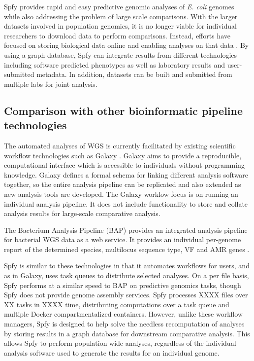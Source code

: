 \documentclass{article}
\begin{document}
Spfy provides rapid and easy predictive genomic analyses of \textit{E. coli} genomes while also addressing the problem of large scale comparisons. With the larger datasets involved in population genomics, it is no longer viable for individual researchers to download data to perform comparisons. Instead, efforts have focused on storing biological data online and enabling analyses on that data \cite{schatz2015biological}. By using a graph database, Spfy can integrate results from  different technologies including software predicted phenotypes as well as laboratory results and user-submitted metadata. In addition, datasets can be built and submitted from multiple labs for joint analysis. 

\subsection{Comparison with other bioinformatic pipeline technologies}


The automated analyses of WGS is currently facilitated by existing scientific workflow technologies such as Galaxy \cite{goecks2010galaxy}. Galaxy aims to provide a reproducible, computational interface which is accessible to individuals without programming knowledge. Galaxy defines a formal schema for linking different analysis software together, so the entire analysis pipeline can be replicated and also extended as new analysis tools are developed. The Galaxy worklow focus is on running an individual analysis pipeline. It does not include functionality to store and collate analysis results for large-scale comparative analysis.

The Bacterium Analysis Pipeline (BAP) \cite{thomsen2016bacterial} provides an integrated analysis pipeline for bacterial WGS data as a web service. It provides an individual per-genome report of the determined species, multilocus sequence type, VF and AMR genes \cite{thomsen2016bacterial}.

Spfy is similar to these technologies in that it automates workflows for users, and as in Galaxy, uses task queues to distribute selected analyses.
On a per file basis, Spfy performs at a similar speed to BAP on predictive genomics tasks, though Spfy does not provide genome assembly services.
Spfy processes XXXX files over XX tasks in XXXX time, distributing computations over a task queue and multiple Docker compartmentalized containers.
However, unlike these workflow managers, Spfy is designed to help solve the needless recomputation of analyses by storing results in a graph database for downstream comparative analysis. This allows Spfy to perform population-wide analyses, regardless of the individual analysis software used to generate the results for an individual genome.
\end{document}
